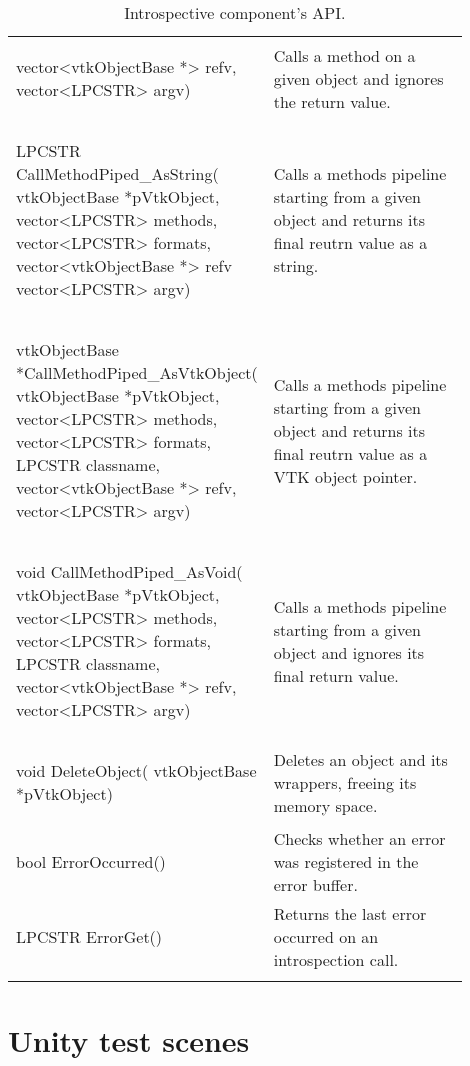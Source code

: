 \begin{appendices}
\begin{landscape}
\begin{longtable}[c]{
			>{\raggedright\arraybackslash}p{0.4\linewidth}
			>{\raggedright\arraybackslash}p{0.5\linewidth}
		}
\begin{codify}
		vector<vtkObjectBase *> refv,
		vector<LPCSTR> argv)
	\end{codify} &
	Calls a method on a given object and ignores the return value.
	\\
	\begin{codify}
	LPCSTR CallMethodPiped_AsString(
		vtkObjectBase *pVtkObject,
		vector<LPCSTR> methods,
		vector<LPCSTR> formats,
		vector<vtkObjectBase *> refv
		vector<LPCSTR> argv)
	\end{codify} &
	Calls a methods pipeline starting from a given object and returns its final reutrn value as a string.
	\\
	\begin{codify}
	vtkObjectBase *CallMethodPiped_AsVtkObject(
		vtkObjectBase *pVtkObject,
		vector<LPCSTR> methods,
		vector<LPCSTR> formats,
		LPCSTR classname,
		vector<vtkObjectBase *> refv,
		vector<LPCSTR> argv)
	\end{codify} &
	Calls a methods pipeline starting from a given object and returns its final reutrn value as a VTK object pointer.
	\\
	\begin{codify}
	void CallMethodPiped_AsVoid(
		vtkObjectBase *pVtkObject,
		vector<LPCSTR> methods,
		vector<LPCSTR> formats,
		LPCSTR classname,
		vector<vtkObjectBase *> refv,
		vector<LPCSTR> argv)
	\end{codify} &
	Calls a methods pipeline starting from a given object and ignores its final return value.
	\\
	\begin{codify}
	void DeleteObject(
		vtkObjectBase *pVtkObject)
	\end{codify} &
	Deletes an object and its wrappers, freeing its memory space.
	\\
	\begin{codify}
	bool ErrorOccurred()
	\end{codify} &
	Checks whether an error was registered in the error buffer.
	\\
	\begin{codify}
	LPCSTR ErrorGet()
	\end{codify} &
	Returns the last error occurred on an introspection call.
	\\
	\caption{Introspective component's API.}
	\label{tab:introspective-api}\\
	\end{longtable}
\end{landscape}

\chapter{Unity test scenes}
\label{apx:unity-test-scenes}


\end{appendices}
